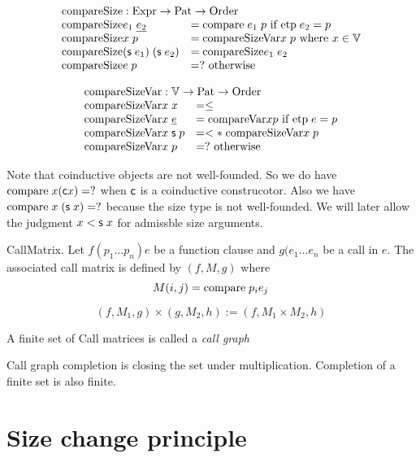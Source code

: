 \[
\begin{array}[t]{ll}
\multicolumn{2}{l}{\cmps : \Expr \ra \Pat \ra \order}\\ 
\cmps e_1 \; \inacc{e_2} & = \cmp e_1 \; p \mbox{ if } \etp e_2 = p \\
\cmps x \; p & = \cmpsv x \;p  \mbox{ where } x \in \cV \\
\cmps (\s e_1) \; (\s e_2) & = \cmps e_1 \; e_2 \\
\cmps e \; p & = ? \mbox{ otherwise}
\end{array}
\]

\[
\begin{array}[t]{ll}
\multicolumn{2}{l}{\cmpsv : \cV \ra \Pat \ra \order}\\ 
\cmpsv x \; x & = \leq \\
\cmpsv x \; \inacc{e} & = \cmpv x p \mbox{ if } \etp e = p \\
\cmpsv x \; \s p & = < * \; \cmpsv x \; p \\
\cmpsv x \; p & = ? \mbox{ otherwise}
\end{array}
\]

Note that coinductive objects are not well-founded. So we do have $\mathrm{compare}\; x (\mathsf{c} x) = ? $ when $\mathsf{c}$ is a coinductive construcotor.
Also we have $\mathrm{compare}\; x \; (\mathsf{s}\; x) = ? $ because the size type is not well-founded.
We will later allow the judgment $x < \mathsf{s}\; x$ for admissble size arguments.

\begin{definition}
CallMatrix. Let $f (p_1 \ldots p_n) e$ be a function clause and $g (e_1 \ldots e_n$ be a call in $e$.
The associated call matrix is defined by $(f,M,g)$ where
\[ M(i,j) = \mathrm{compare}\; p_i e_j \]
\end{definition}

\begin{definition}
\[(f,M_1,g) \times (g,M_2,h) := (f,M_1 \times M_2,h)\]
\end{definition}

\begin{definition}
A finite set of Call matrices is called a \emph{call graph}
\end{definition}

\begin{definition}
Call graph completion is closing the set under multiplication.
Completion of a finite set is also finite. 
\end{definition}

\section{Size change principle}

